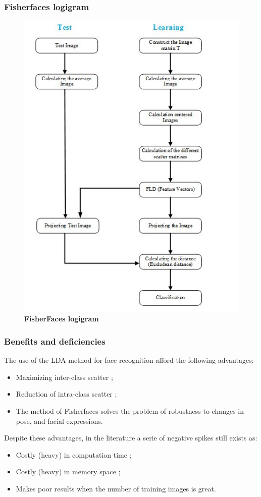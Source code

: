 \subsubsection{Fisherfaces logigram }
\begin{figure}[bth]%
\begin{center}
\includegraphics[scale=0.85]{test_learn}%
\caption{\textbf{FisherFaces logigram}}%
\label{test_learn}%
\end {center}
\end{figure}

\subsubsection{Benefits and deficiencies}
The use of the LDA method for face recognition afford the following advantages:
\begin{itemize}
\item Maximizing inter-class scatter ;
\item Reduction of intra-class scatter ;
\item The method of Fisherfaces solves the problem of robustness to changes in pose, and facial expressions.
\end{itemize}

Despite these advantages, in the literature a serie of negative spikes still exists as:
\begin{itemize}
\item Costly (heavy) in computation time ;
\item Costly (heavy)  in memory space ;
\item Makes poor results when the number of training images is great.
\end{itemize} 

